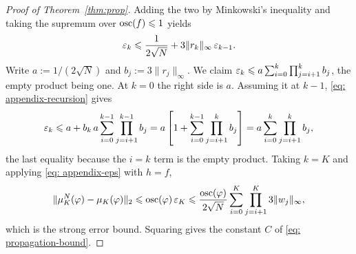 \documentclass{article}
\begin{document}
\begin{proof}[Proof of Theorem~\ref{thm:prop}]
Adding the two by Minkowski's inequality and taking the supremum over $\operatorname{osc}(f)\leqslant1$ yields
\begin{equation}
    \varepsilon_k \leqslant \frac{1}{2\sqrt N} + 3\lVert r_k\rVert_\infty\,\varepsilon_{k-1}.
    \label{eq: appendix-recursion}
\end{equation}
Write $a:=1/(2\sqrt N)$ and $b_j:=3\lVert r_j\rVert_\infty$. We claim $\varepsilon_k\leqslant a\sum_{i=0}^{k}\prod_{j=i+1}^{k}b_j$, the empty product being one. At $k=0$ the right side is $a$. Assuming it at $k-1$, \eqref{eq: appendix-recursion} gives
\begin{equation*}
    \varepsilon_k \leqslant a + b_k\,a\sum_{i=0}^{k-1}\prod_{j=i+1}^{k-1}b_j
    = a\left[1+\sum_{i=0}^{k-1}\prod_{j=i+1}^{k}b_j\right]
    = a\sum_{i=0}^{k}\prod_{j=i+1}^{k}b_j,
\end{equation*}
the last equality because the $i=k$ term is the empty product. Taking $k=K$ and applying \eqref{eq: appendix-eps} with $h=f$,
\begin{equation*}
    \lVert\mu_K^N(\varphi)-\mu_K(\varphi)\rVert_2 \leqslant \operatorname{osc}(\varphi)\,\varepsilon_K
    \leqslant \frac{\operatorname{osc}(\varphi)}{2\sqrt N}\sum_{i=0}^{K}\prod_{j=i+1}^{K}3\lVert w_j \rVert_\infty ,
\end{equation*}
which is the strong error bound. Squaring gives the constant $C$ of \eqref{eq: propagation-bound}.
\end{proof}
\end{document}
